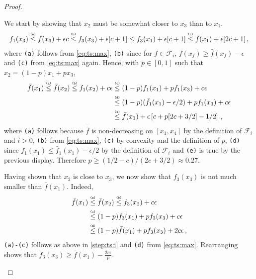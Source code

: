 \documentclass[letter, 12pt]{report}
\newcommand{\explan}[1]{\stackrel{\text{\tiny \texttt{#1}}}}
\newcommand{\sF}{\mathscr F}
\newcommand{\1}{\mathbf{1}}
\theoremstyle{plain}
\theoremstyle{definition}
\theoremstyle{remark}
\begin{document}
\begin{proof}
    \begin{enumsteps}
        \item \label{step:ts:i} We start by showing that $x_2$ must be somewhat closer to $x_3$ than to $x_1$.
        \begin{align*}
            f_1(x_3)
            \explan{(a)}\leq \bar f(x_3) + \epsilon c
            \explan{(b)}\leq f_3(x_3) + \epsilon[c+1] \leq f_3(x_1) + \epsilon[c+1]
            \explan{(c)}\leq \bar f(x_1) + \epsilon[2c+1] \,,
        \end{align*}
        where \texttt{(a)} follows from \cref{eq:ts:max}, \texttt{(b)} since for $f \in \sF_i$, $f(x_f) \geq \bar f(x_f) - \epsilon$
        and \texttt{(c)} from \cref{eq:ts:max} again.
        Hence, with $p \in [0,1]$ such that $x_2 = (1 - p)x_1 + p x_3$,
        \begin{align*}
            \bar f(x_1)
            \explan{(a)}\leq \bar f(x_2)
            \explan{(b)}\leq f_1(x_2) + c\epsilon
             & \explan{(c)}\leq (1 - p) f_1(x_1) + p f_1(x_3) + c\epsilon                     \\
             & \explan{(d)}\leq (1 - p) (\bar f_1(x_1) - \epsilon/2) + p f_1(x_3) + c\epsilon \\
             & \explan{(e)}\leq \bar f(x_1) + \epsilon\left[c + p[2c + 3/2] - 1/2\right] \,,
        \end{align*}
        where \texttt{(a)} follows because $\bar f$ is non-decreasing on $[x_1,x_4]$ by the definition of $\sF_i$ and $i > 0$,
        \texttt{(b)} from \cref{eq:ts:max},
        \texttt{(c)} by convexity and the definition of $p$,
        \texttt{(d)} since $f_1(x_1) \leq \bar f_1(x_1) - \epsilon/2$ by the definition of $\sF_i$ and
        \texttt{(e)} is true by the previous display.
        Therefore $p \geq (1/2 - c) / (2c + 3/2) \approx 0.27$.

        \item \label{step:ts:ii} Having shown that $x_2$ is close to $x_3$, we now show that $f_3(x_3)$ is not much smaller than $\bar f(x_1)$. Indeed,
        \begin{align*}
            \bar f(x_1)
             & \explan{(a)}\leq \bar f(x_2)
            \explan{(b)}\leq f_3(x_2) + c\epsilon                                 \\
             & \explan{(c)}\leq (1 - p) f_3(x_1) + p f_3(x_3) + c\epsilon         \\
             & \explan{(d)}\leq (1 - p) \bar f(x_1) + p f_3(x_3) + 2c\epsilon \,,
        \end{align*}
        \texttt{(a)-(c)} follows as above in \ref{step:ts:i} and \texttt{(d)} from \cref{eq:ts:max}.
        Rearranging shows that $f_3(x_3) \geq \bar f(x_1) - \frac{2c\epsilon}{p}$.


\end{enumsteps}
\end{proof}
\end{document}
